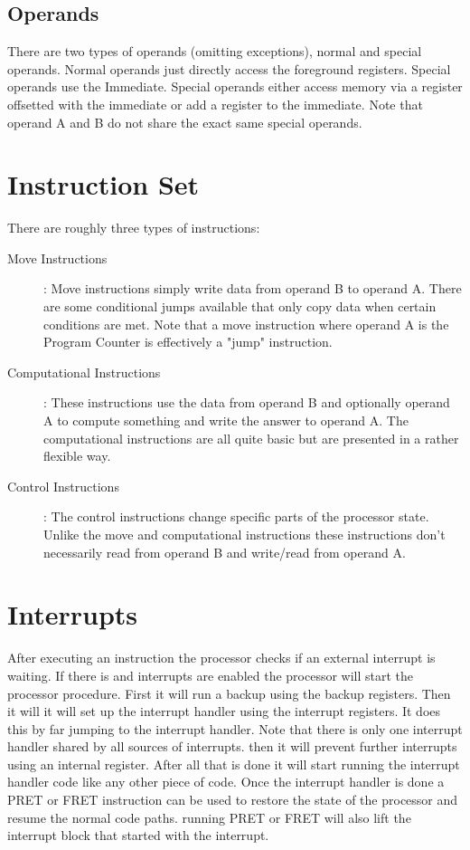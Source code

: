 \documentclass[oneside, a4paper]{memoir}
\begin{document}
\subsection{Operands}
There are two types of operands (omitting exceptions), normal and special operands. Normal operands just directly access the foreground registers. Special operands use the Immediate. Special operands either access memory via a register offsetted with the immediate or add a register to the immediate. Note that operand A and B do not share the exact same special operands.
\section{Instruction Set}
There are roughly three types of instructions:
\begin{description}
\item[Move Instructions]: Move instructions simply write data from operand B to operand A. There are some conditional jumps available that only copy data when certain conditions are met. Note that a move instruction where operand A is the Program Counter is effectively a "jump" instruction.
\item[Computational Instructions]: These instructions use the data from operand B and optionally operand A to compute something and write the answer to operand A. The computational instructions are all quite basic but are presented in a rather flexible way.
\item[Control Instructions]: The control instructions change specific parts of the processor state. Unlike the move and computational instructions these instructions don't necessarily read from operand B and write/read from operand A.
\end{description}
\section{Interrupts}
After executing an instruction the processor checks if an external interrupt is waiting. If there is and interrupts are enabled the processor will start the processor procedure. First it will run a backup using the backup registers. Then it will it will set up the interrupt handler using the interrupt registers. It does this by far jumping to the interrupt handler. Note that there is only one interrupt handler shared by all sources of interrupts. then it will prevent further interrupts using an internal register. After all that is done it will start running the interrupt handler code like any other piece of code. Once the interrupt handler is done a PRET or FRET instruction can be used to restore the state of the processor and resume the normal code paths. running PRET or FRET will also lift the interrupt block that started with the interrupt.
\end{document}

